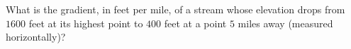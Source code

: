 What is the gradient, in feet per mile, of a stream whose elevation drops from $1600$ feet at its highest point to $400$ feet at a point $5$ miles away (measured horizontally)?
